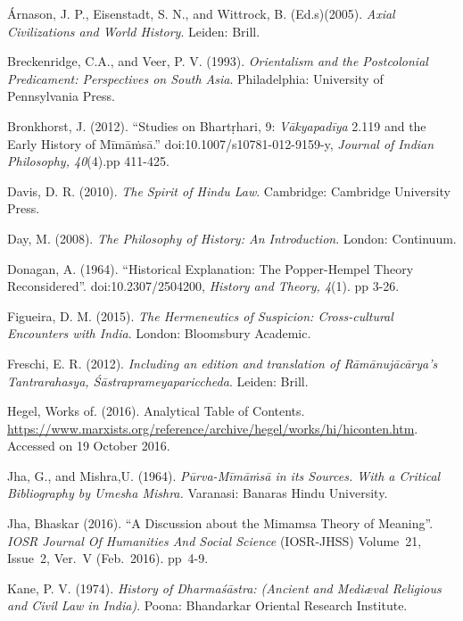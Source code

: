 \begin{thebibliography}{99}
\itemsep=2pt
 Árnason, J. P., Eisenstadt, S. N., and Wittrock, B. (Ed.s)(2005). \textit{Axial Civilizations and World History}. Leiden: Brill.

  Breckenridge, C.A., and Veer, P. V. (1993). \textit{Orientalism and the Postcolonial Predicament: Perspectives on South Asia}. Philadelphia: University of Pennsylvania Press.

  Bronkhorst, J. (2012). “Studies on Bhartṛhari, 9: \textit{Vākyapadīya} 2.119 and the Early History of Mīmāṁsā.” doi:10.1007/s10781-012-9159-y, \textit{Journal of Indian Philosophy, 40}(4).pp 411-425.

  Davis, D. R. (2010). \textit{The Spirit of Hindu Law}. Cambridge: Cambridge University Press.

  Day, M. (2008). \textit{The Philosophy of History: An Introduction}. London: Continuum.

  Donagan, A. (1964). “Historical Explanation: The Popper-Hempel Theory Reconsidered”. doi:10.2307/2504200, \textit{History and Theory, 4}(1). pp 3-26.

  Figueira, D. M. (2015). \textit{The Hermeneutics of Suspicion: Cross-cultural Encounters with India}. London: Bloomsbury Academic.

  Freschi, E. R. (2012). \textit{Including an edition and translation of Rāmānujācārya's Tantrarahasya, Śāstraprameyapariccheda}. Leiden: Brill.

  Hegel, Works of. (2016). Analytical Table of Contents. \url{https://www.marxists.org/reference/archive/hegel/works/hi/hiconten.htm}. Accessed on 19 October 2016.

  Jha, G., and Mishra,U. (1964). \textit{Pūrva-Mīmāṁsā in its Sources. With a Critical Bibliography by Umesha Mishra.} Varanasi: Banaras Hindu University.

  Jha, Bhaskar (2016). “A Discussion about the Mimamsa Theory of Meaning”. \textit{IOSR Journal Of Humanities And Social Science} (IOSR-JHSS) Volume~21, Issue~2, Ver.~V (Feb.~2016). pp~4-9.

  Kane, P. V. (1974). \textit{History of Dharmaśāstra: (Ancient and Mediæval Religious and Civil Law in India)}. Poona: Bhandarkar Oriental Research Institute.


\end{thebibliography}
